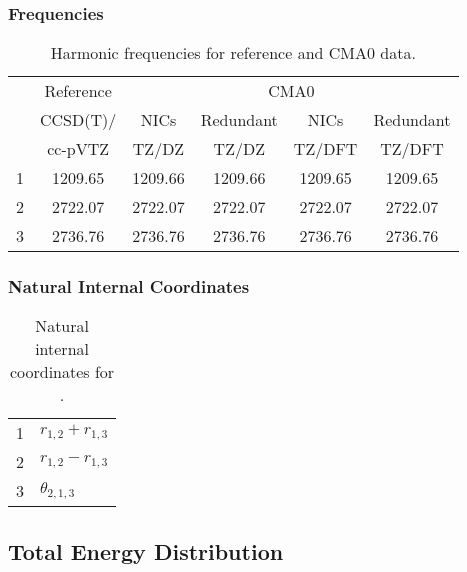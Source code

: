 \documentclass[10pt,oneside]{article}
\begin{document}
\begin{table}[h!]
\subsubsection*{Frequencies}
\centering
\caption{Harmonic frequencies for reference and CMA0 data.}
\begin{tabular}{cccccc}
\toprule
{} & Reference & \multicolumn{4}{c}{CMA0} \\
{} &  CCSD(T)/ &    NICs &  Redundant &    NICs & Redundant \\
{} &   cc-pVTZ &   TZ/DZ &      TZ/DZ &  TZ/DFT &    TZ/DFT \\
\midrule
1 &   1209.65 & 1209.66 &    1209.66 & 1209.65 &   1209.65 \\
2 &   2722.07 & 2722.07 &    2722.07 & 2722.07 &   2722.07 \\
3 &   2736.76 & 2736.76 &    2736.76 & 2736.76 &   2736.76 \\
\bottomrule
\end{tabular}
\end{table}

\begin{table}[h!]
\subsubsection*{Natural Internal Coordinates}
\centering
\caption{Natural internal coordinates for .}
\small
\begin{tabular}{ll}
\toprule
  1   & $r_{1,2} + r_{1,3}$ \\
  2   & $r_{1,2} - r_{1,3}$ \\
  3   & $\theta_{2,1,3}$ \\
\bottomrule
\end{tabular}
\end{table}

\begin{table}
\subsection*{Total Energy Distribution}
\centering\end{table}

\clearpage

\subsection{}
\end{document}
